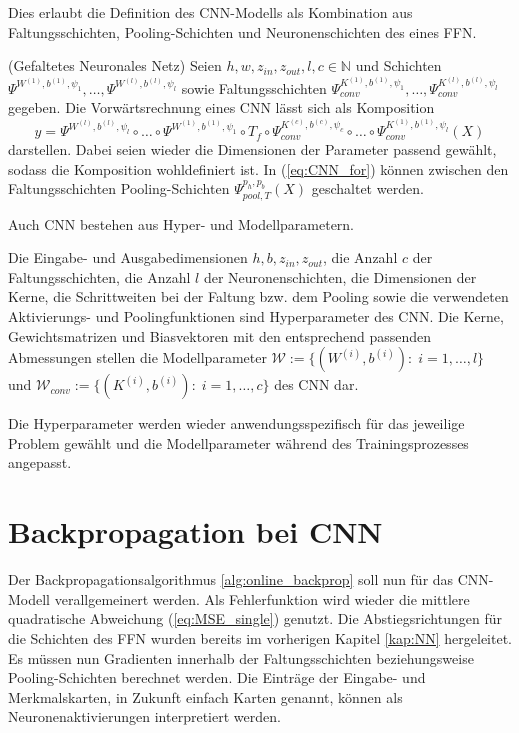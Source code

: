 Dies erlaubt die Definition des CNN-Modells als Kombination aus Faltungsschichten, Pooling-Schichten und Neuronenschichten des eines FFN.
\begin{defi}(Gefaltetes Neuronales Netz)
    \label{def_fw_cnn}
    Seien $h, w, z_{in}, z_{out}, l ,c \in \mathbb{N}$ und Schichten $\Psi^{W^{(1)},b^{(1)},\psi_{1}}, \ldots, \Psi^{W^{(l)},b^{(l)},\psi_{l}}$ sowie Faltungsschichten $\Psi_{conv}^{K^{(1)},b^{(1)},\psi_{1}}, \ldots, \Psi_{conv}^{K^{(l)},b^{(l)},\psi_{l}}$ gegeben. Die Vorwärtsrechnung eines CNN lässt sich als Komposition
    \begin{equation}
        \label{eq:CNN_for}
        y=\Psi^{W^{(l)},b^{(l)},\psi_{l}} \circ \ldots \circ \Psi^{W^{(1)},b^{(1)},\psi_{1}} \circ T_f \circ \Psi_{conv}^{K^{(c)},b^{(c)},\psi_{c}} \circ \ldots \circ \Psi_{conv}^{K^{(1)},b^{(1)},\psi_{l}}(X)
    \end{equation} 
    darstellen. Dabei seien wieder die Dimensionen der Parameter passend gewählt, sodass die Komposition wohldefiniert ist. In (\ref{eq:CNN_for}) können zwischen den Faltungsschichten Pooling-Schichten $\Psi_{pool,T}^{p_h,p_b}(X)$ geschaltet werden.
\end{defi}
Auch CNN bestehen aus Hyper- und Modellparametern.

\begin{defi}
    Die Eingabe- und Ausgabedimensionen $h, b, z_{in}, z_{out}$, die Anzahl $c$ der Faltungsschichten, die Anzahl $l$ der Neuronenschichten, die Dimensionen der Kerne, die Schrittweiten bei der Faltung bzw. dem Pooling sowie die verwendeten Aktivierungs- und Poolingfunktionen sind Hyperparameter des CNN.
    Die Kerne, Gewichtsmatrizen und Biasvektoren mit den entsprechend passenden Abmessungen stellen die Modellparameter $\mathcal{W}:=\{(W^{(i)},b^{(i)}): \; i=1, \ldots, l\}$ und $\mathcal{W}_{conv}:=\{(K^{(i)}, b^{(i)}): \; i=1, \ldots, c\}$ des CNN dar. 
\end{defi}
Die Hyperparameter werden wieder anwendungsspezifisch für das jeweilige Problem gewählt und die Modellparameter während des Trainingsprozesses angepasst. 

\section{Backpropagation bei CNN}
\label{abs:CNN_train}
Der Backpropagationsalgorithmus \ref{alg:online_backprop} soll nun für das CNN-Modell verallgemeinert werden. 
Als Fehlerfunktion wird wieder die mittlere quadratische Abweichung (\ref{eq:MSE_single})
genutzt. 
Die Abstiegsrichtungen für die Schichten des FFN wurden bereits im vorherigen Kapitel \ref{kap:NN} hergeleitet. Es müssen nun Gradienten innerhalb der Faltungsschichten beziehungsweise Pooling-Schichten berechnet werden. Die Einträge der Eingabe- und Merkmalskarten, in Zukunft einfach Karten genannt, können als Neuronenaktivierungen interpretiert werden. 

